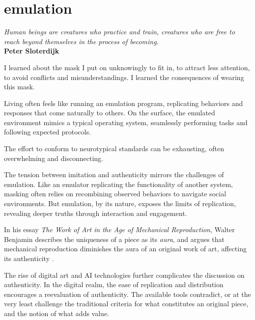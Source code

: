 \chapter*{emulation}
\begin{center}
\vspace{2cm}
\begin{flushright}
\large
\textit{Human beings are creatures who practice and train, creatures who are free to reach beyond themselves in the process of becoming.}\\
\textbf{Peter Sloterdijk} \citep{sloterdijk2014}
\end{flushright}
\vspace{2cm}
\end{center}
\normalsize

\newpage  %
I learned about the mask I put on unknowingly to fit in, to attract less attention, to avoid conflicts and misunderstandings. I learned the consequences of wearing this mask.

Living often feels like running an emulation program, replicating behaviors and responses that come naturally to others. On the surface, the emulated environment mimics a typical operating system, seamlessly performing tasks and following expected protocols. 

The effort to conform to neurotypical standards can be exhausting, often overwhelming and disconnecting.

The tension between imitation and authenticity mirrors the challenges of emulation. Like an emulator replicating the functionality of another system, masking often relies on recombining observed behaviors to navigate social environments. But emulation, by its nature, exposes the limits of replication, revealing deeper truths through interaction and engagement.

In his essay \textit{The Work of Art in the Age of Mechanical Reproduction}, Walter Benjamin describes the uniqueness of a piece as its \textit{aura}, and argues that mechanical reproduction diminishes the aura of an original work of art, affecting its authenticity \citep{benjamin1935}. 

The rise of digital art and AI technologies further complicates the discussion on authenticity. In the digital realm, the ease of replication and distribution encourages a reevaluation of authenticity. The available tools contradict, or at the very least challenge the traditional criteria for what constitutes an original piece, and the notion of what adds value. 

